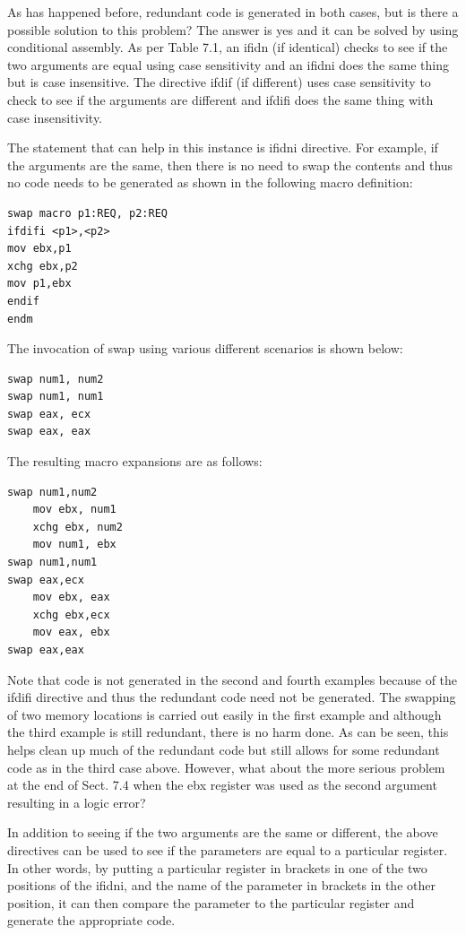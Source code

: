 \documentclass[10pt]{book}
\begin{document}
As has happened before, redundant code is generated in both cases, but is there a possible solution to this problem? The answer is yes and it can be solved by using conditional assembly. As per Table 7.1, an ifidn (if identical) checks to see if the two arguments are equal using case sensitivity and an ifidni does the same thing but is case insensitive. The directive ifdif (if different) uses case sensitivity to check to see if the arguments are different and ifdifi does the same thing with case insensitivity.

The statement that can help in this instance is ifidni directive. For example, if the arguments are the same, then there is no need to swap the contents and thus no code needs to be generated as shown in the following macro definition:

\begin{verbatim}
swap macro p1:REQ, p2:REQ
ifdifi <p1>,<p2>
mov ebx,p1
xchg ebx,p2
mov p1,ebx
endif
endm
\end{verbatim}

The invocation of swap using various different scenarios is shown below:

\begin{verbatim}
swap num1, num2
swap num1, num1
swap eax, ecx
swap eax, eax
\end{verbatim}

The resulting macro expansions are as follows:

\begin{verbatim}
swap num1,num2
    mov ebx, num1
    xchg ebx, num2
    mov num1, ebx
swap num1,num1
swap eax,ecx
    mov ebx, eax
    xchg ebx,ecx
    mov eax, ebx
swap eax,eax
\end{verbatim}

Note that code is not generated in the second and fourth examples because of the ifdifi directive and thus the redundant code need not be generated. The swapping of two memory locations is carried out easily in the first example and although the third example is still redundant, there is no harm done. As can be seen, this helps clean up much of the redundant code but still allows for some redundant code as in the third case above. However, what about the more serious problem at the end of Sect. 7.4 when the ebx register was used as the second argument resulting in a logic error?

In addition to seeing if the two arguments are the same or different, the above directives can be used to see if the parameters are equal to a particular register. In other words, by putting a particular register in brackets in one of the two positions of the ifidni, and the name of the parameter in brackets in the other position, it can then compare the parameter to the particular register and generate the appropriate code.
\end{document}
